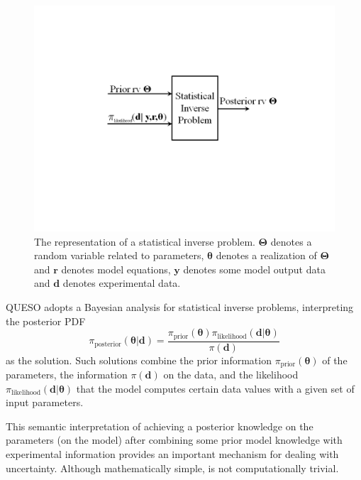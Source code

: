 \begin{figure}[h!]
\centerline{
\includegraphics[scale=0.45,clip=true,viewport=1.0in 3.0in 10.0in 5.5in]{figs/queso_paper1_10}
}
\caption{
The representation of a statistical inverse problem.
$\boldsymbol{\Theta}$ denotes a random variable related to parameters,
$\boldsymbol{\theta}$ denotes a realization of $\boldsymbol{\Theta}$ and
$\mathbf{r}$ denotes model equations,
$\mathbf{y}$ denotes some model output data and
$\mathbf{d}$ denotes experimental data.
}
\label{fig-sip-queso}
\end{figure}


QUESO adopts a Bayesian analysis \cite{KaSo05, Ro04} for statistical inverse problems, interpreting the posterior PDF
\begin{equation}\label{eq-Bayes-solution}
\pi_{\text{posterior}}(\boldsymbol{\theta}|\mathbf{d})=\frac{\pi_{\text{prior}}(\boldsymbol{\theta})\pi_{\text{likelihood}}(\mathbf{d}|\boldsymbol{\theta})}{\pi(\mathbf{d})}
\end{equation}
as the solution. Such solutions combine the prior information $\pi_{\text{prior}}(\boldsymbol{\theta})$ of the parameters,
the information $\pi(\mathbf{d})$ on the data, and the likelihood $\pi_{\text{likelihood}}(\mathbf{d}|\boldsymbol{\theta})$ that the model computes certain data values with a given set of input parameters.

This semantic interpretation of achieving a posterior knowledge on the parameters (on the model)
after combining some prior model knowledge with experimental information provides an important mechanism for dealing with uncertainty.
Although mathematically simple, is not computationally trivial. 


